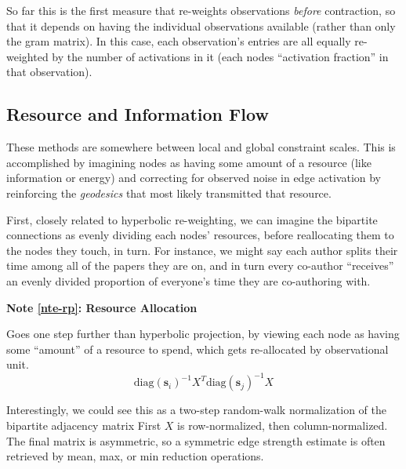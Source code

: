\documentclass[%
	12pt,
		oneside,
		letterpaper
]{book}
\newcounter{quartocalloutnteno}
\newcommand{\quartocalloutnte}[1]{\refstepcounter{quartocalloutnteno}\label{#1}}
\begin{document}
So far this is the first measure that re-weights observations
\emph{before} contraction, so that it depends on having the individual
observations available (rather than only the gram matrix). In this case,
each observation's entries are all equally re-weighted by the number of
activations in it (each nodes ``activation fraction'' in that
observation).

\subsection{Resource and Information
Flow}\label{resource-and-information-flow}

These methods are somewhere between local and global constraint scales.
This is accomplished by imagining nodes as having some amount of a
resource (like information or energy) and correcting for observed noise
in edge activation by reinforcing the \emph{geodesics} that most likely
transmitted that resource.

First, closely related to hyperbolic re-weighting, we can imagine the
bipartite connections as evenly dividing each nodes' resources, before
reallocating them to the nodes they touch, in turn. For instance, we
might say each author splits their time among all of the papers they are
on, and in turn every co-author ``receives'' an evenly divided
proportion of everyone's time they are co-authoring with.

\begin{tcolorbox}[enhanced jigsaw, colback=white, rightrule=.15mm, opacityback=0, colframe=quarto-callout-note-color-frame, bottomrule=.15mm, arc=.35mm, breakable, leftrule=.75mm, left=2mm, toprule=.15mm]

\quartocalloutnte{nte-rp} 

\vspace{-3mm}\textbf{Note \ref*{nte-rp}: Resource Allocation}\vspace{3mm}

Goes one step further than hyperbolic projection, by viewing each node
as having some ``amount'' of a resource to spend, which gets
re-allocated by observational unit.
\autocite{Bipartitenetworkprojection_Zhou2007}
\[ \text{diag}(\mathbf{s}_i)^{-1}X^T\text{diag}(\mathbf{s}_j)^{-1}X \]

\end{tcolorbox}

Interestingly, we could see this as a two-step random-walk normalization
of the bipartite adjacency matrix First \(X\) is row-normalized, then
column-normalized. The final matrix is asymmetric, so a symmetric edge
strength estimate is often retrieved by mean, max, or min reduction
operations.
\end{document}
